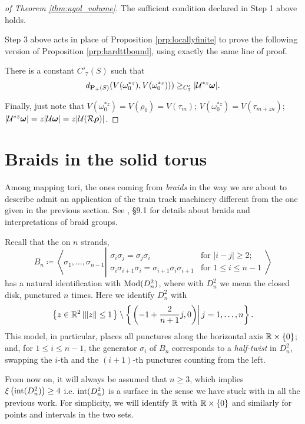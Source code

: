 \begin{proof}[of Theorem \ref{thm:agol_volume}]
 The sufficient condition declared in Step 1 above holds.

Step 3 above acts in place of Proposition \ref{prp:locallyfinite} to prove the following version of Proposition \ref{prp:hardttbound}, using exactly the same line of proof.
\begin{claim}
There is a constant $C'_7(S)$ such that
$$d_{{\mathbf{P}_+}(S)}(V(\omega^{*z}_0),V(\omega^{*z}_0)))\geq_{C'_7}|{\mathcal U}^{*z}\bm\omega|.$$
\end{claim}

Finally, just note that $V(\omega^{*z}_0)=V(\rho_0)=V(\tau_m)$; $V(\omega^{*z}_0)=V(\tau_{m+zn})$;\linebreak $|{\mathcal U}^{*z}\bm\omega|=z|{\mathcal U}\bm\omega|= z|{\mathcal U}({\mathcal R}\bm\rho)|$.
\end{proof}

\section{Braids in the solid torus}\label{sec:dw}

Among mapping tori, the ones coming from \emph{braids} in the way we are about to describe admit an application of the train track machinery different from the one given in the previous section. See \cite{farb}, \S 9.1 for details about braids and interpretations of braid groups.

Recall that the  on $n$ strands,
\begin{equation}\label{eqn:braidgroup}
B_n\coloneqq \left\langle\sigma_1,\ldots,\sigma_{n-1}\left|
\begin{array}{lr}
\sigma_i\sigma_j=\sigma_j\sigma_i & \text{for }|i-j|\geq2;\\
\sigma_i\sigma_{i+1}\sigma_i=\sigma_{i+1}\sigma_i\sigma_{i+1} & \text{for }1\leq i\leq n-1
\end{array}
\right.\right\rangle
\end{equation}
has a natural identification with $\mathrm{Mod}(D^2_n)$, where with $D^2_n$ we mean the closed disk, punctured $n$ times. Here we identify $D^2_n$ with 
$$
\left\{z\in \mathbb R^2\left| \|z\|\leq 1\right.\right\}\setminus \left\{\left.\left(-1+\frac{2}{n+1}j,0\right) \right|j=1,\ldots,n\right\}.
$$
This model, in particular, places all punctures along the horizontal axis $\mathbb R\times\{0\}$; and, for $1\leq i\leq n-1$, the generator $\sigma_i$ of $B_n$ corresponds to a \emph{half-twist} in $D^2_n$, swapping the $i$-th and the $(i+1)$-th punctures counting from the left.

From now on, it will always be assumed that $n\geq 3$, which implies $\xi\left(\mathrm{int}(D^2_n)\right)\geq 4$ i.e. $\mathrm{int}(D^2_n)$ is a surface in the sense we have stuck with in all the previous work. For simplicity, we will identify $\mathbb R$ with $\mathbb R\times\{0\}$ and similarly for points and intervals in the two sets.

